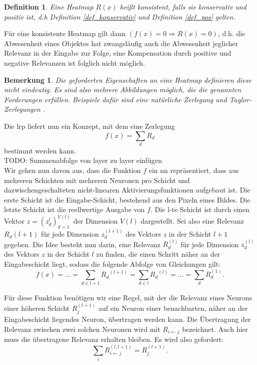 \documentclass[11pt,a4paper]{article}
\def\emph#1{\textit{#1}}
\newtheorem{definition}[theorem]{Definition}
\newtheorem{remark}[theorem]{Bemerkung}
\numberwithin{equation}{section}
\begin{document}
	\begin{definition}
		Eine Heatmap $R(x)$ heißt \emph{konsistent}, falls sie konservativ und positiv ist, d.h Definition \ref{def_konservativ} und Definition \ref{def_pos} gelten.
	\end{definition}
	
	Für eine konsistente Heatmap gilt dann $(f(x) = 0 \Rightarrow R(x) = 0)$, d.h. die Abwesenheit eines Objektes hat zwangsläufig auch die Abwesenheit jeglicher Relevanz in der Eingabe zur Folge, eine Kompensation durch positive und negative Relevanzen ist folglich nicht möglich.
	
	\begin{remark}
		Die geforderten Eigenschaften an eine Heatmap definieren diese nicht eindeutig. Es sind also mehrere Abbildungen möglich, die die genannten Forderungen erfüllen. Beispiele dafür sind eine natürliche Zerlegung und Taylor-Zerlegungen \cite{dtd_paper}.
	\end{remark}
	
	Die \gls{lrp} liefert nun ein Konzept, mit dem eine Zerlegung 
	\begin{equation}
	f(x) = \sum_dR_d
	\end{equation}
	bestimmt werden kann.\\
	TODO: Summenabfolge von layer zu layer einfügen\\
	
	
	Wir gehen nun davon aus, dass die Funktion $f$ ein \gls{nn} repräsentiert, dass aus mehreren Schichten mit mehreren Neuronen pro Schicht und dazwischengeschalteten nicht-linearen Aktivierungsfunktionen aufgebaut ist.
	Die erste Schicht ist die Eingabe-Schicht, bestehend aus den Pixeln eines Bildes. Die letzte Schicht ist die reellwertige Ausgabe von $f$. Die l-te Schicht ist durch einen Vektor $z = (z_d^{l})_{d=1}^{V(l)}$ der Dimension $V(l)$ dargestellt. Sei also eine Relevanz $R_d{(l+1)}$ für jede Dimension $z_d^{(l+1)}$ des Vektors $z$ in der Schicht $l+1$ gegeben. Die Idee besteht nun darin, eine Relevanz $R_d^{(l)}$ für jede Dimension $z_d^{(l)}$ des Vektors $z$ in der Schicht $l$ zu finden, die einen Schritt näher an der Eingabeschicht liegt, sodass die folgende Abfolge von Gleichungen gilt:
	\begin{equation}
	f(x) = ... = \sum_{d\in l+1}{R_d}^{(l+1)} = \sum_{d\in l}{R_d}^{(l)} = ... = \sum_d{R_d^{(1)}}.\label{erhaltungseigenschaft}
	\end{equation}
	
	
	Für diese Funktion benötigen wir eine Regel, mit der die Relevanz eines Neurons einer höheren Schicht $R_j^{(l+1)}$ auf ein Neuron einer benachbarten, näher an der Eingabeschicht liegendes Neuron, übertragen werden kann.
	Die Übertragung der Relevanz zwischen zwei solchen Neuronen wird mit $R_{i\leftarrow j}$ bezeichnet. Auch hier muss die übertragene Relevanz erhalten bleiben. Es wird also gefordert:
	\begin{equation}
	\sum_i{R_{i\leftarrow j}^{(l,l+1)}} = R_j^{(l+1)}.
	\end{equation}
	
\end{document}
